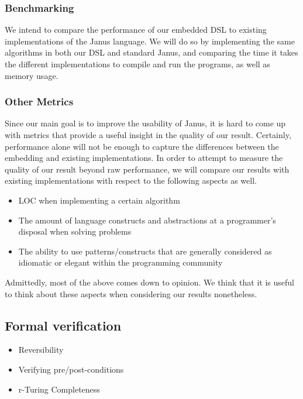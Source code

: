 \documentclass[12pt,a4paper]{article}
\begin{document}
    \subsubsection{Benchmarking}
    We intend to compare the performance of our embedded DSL to existing implementations of the Janus language. We will do so by implementing the same algorithms in both our DSL and standard Janus, and comparing the time it takes the different implementations to compile and run the programs, as well as memory usage.
    \subsubsection{Other Metrics}
    Since our main goal is to improve the usability of Janus, it is hard to come up with metrics that provide a useful insight in the quality of our result. Certainly, performance alone will not be enough to capture the differences between the embedding and existing implementations. In order to attempt to measure the quality of our result beyond raw performance, we will compare our results with existing implementations with respect to the following aspects as well. 
	\begin{itemize}
		\item{LOC when implementing a certain algorithm}
		\item{The amount of language constructs and abstractions at a programmer's disposal when solving problems}
        \item{The ability to use patterns/constructs that are generally considered as idiomatic or elegant within the programming community}
	\end{itemize}
Admittedly, most of the above comes down to opinion. We think that it is useful to think about these aspects when considering our results nonetheless. 
	
	\subsection{Formal verification}
	\begin{itemize}
		\item{Reversibility}
		\item{Verifying pre/post-conditions}
		\item{r-Turing Completeness}
	\end{itemize}
\end{document}

